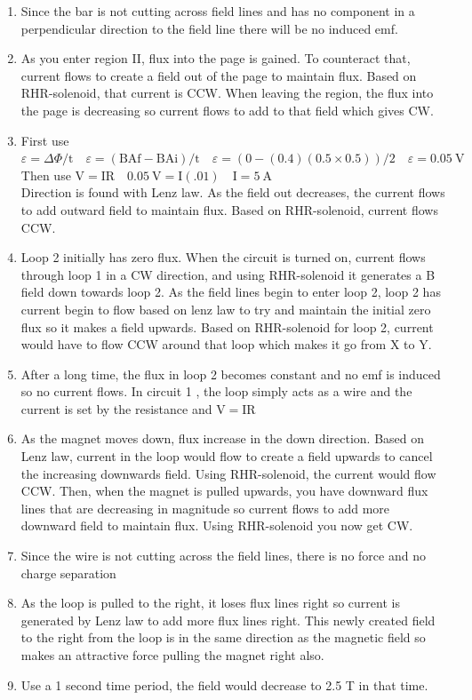 \begin{enumerate}
\begin{enumerate}
  \item Since the bar is not cutting across field lines and has no component in a perpendicular direction to the field line there will be no induced emf.
  \item As you enter region II, flux into the page is gained. To counteract that, current flows to create a field out of the page to maintain flux. Based on RHR-solenoid, that current is CCW. When leaving the region, the flux into the page is decreasing so current flows to add to that field which gives CW.
  \item First use $\varepsilon=\Delta \Phi / \mathrm{t} \quad \varepsilon=(\mathrm{BAf}-\mathrm{BAi}) / \mathrm{t} \quad \varepsilon=(0-(0.4)(0.5 \times 0.5)) / 2 \quad \varepsilon=0.05 \mathrm{~V}$ Then use $\mathrm{V}=\mathrm{IR} \quad 0.05 \mathrm{~V}=\mathrm{I}(.01) \quad \mathrm{I}=5 \mathrm{~A}$\\
Direction is found with Lenz law. As the field out decreases, the current flows to add outward field to maintain flux. Based on RHR-solenoid, current flows CCW.
  \item Loop 2 initially has zero flux. When the circuit is turned on, current flows through loop 1 in a CW direction, and using RHR-solenoid it generates a B field down towards loop 2. As the field lines begin to enter loop 2, loop 2 has current begin to flow based on lenz law to try and maintain the initial zero flux so it makes a field upwards. Based on RHR-solenoid for loop 2, current would have to flow CCW around that loop which makes it go from X to Y.
  \item After a long time, the flux in loop 2 becomes constant and no emf is induced so no current flows. In circuit 1 , the loop simply acts as a wire and the current is set by the resistance and $\mathrm{V}=\mathrm{IR}$
  \item As the magnet moves down, flux increase in the down direction. Based on Lenz law, current in the loop would flow to create a field upwards to cancel the increasing downwards field. Using RHR-solenoid, the current would flow CCW. Then, when the magnet is pulled upwards, you have downward flux lines that are decreasing in magnitude so current flows to add more downward field to maintain flux. Using RHR-solenoid you now get CW.
  \item Since the wire is not cutting across the field lines, there is no force and no charge separation
  \item As the loop is pulled to the right, it loses flux lines right so current is generated by Lenz law to add more flux lines right. This newly created field to the right from the loop is in the same direction as the magnetic field so makes an attractive force pulling the magnet right also.
  \item Use a 1 second time period, the field would decrease to 2.5 T in that time.
\end{enumerate}


\end{enumerate}
